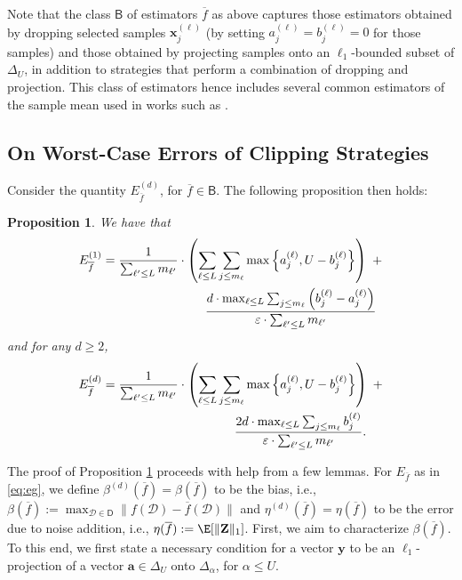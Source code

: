 \documentclass[conference,letterpaper]{IEEEtran}
\newtheorem{proposition}{Proposition}[section]
\theoremstyle{remark}
\theoremstyle{definition}
\begin{document}
Note that the class $\mathsf{B}$ of estimators $\overline{f}$ as above  captures those estimators obtained by dropping selected samples $\mathbf{x}_j^{(\ell)}$ (by setting $a_j^{(\ell)}= b_j^{(\ell)} = 0$ for those samples) and those obtained by projecting samples onto an $\ell_1$-bounded subset of $\Delta_U$, in addition to strategies that perform a combination of dropping and projection. This class of estimators hence includes several common estimators of the sample mean used in works such as \cite{userlevel,dp_preprint,tit-preprint}.


\subsection{On Worst-Case Errors of Clipping Strategies}
\label{sec:worst-case}
Consider the quantity $E_{\overline{f}}^{(d)}$, for $\overline{f}\in \mathsf{B}$. The following proposition then holds:
\begin{proposition}
	\label{lem:worst-case}
	We have that
	\begin{align*}
		E_{\overline{f}}^{(1)} \notag&= \frac{1}{\sum_{\ell'\leq L} m_{\ell'}}\cdot \left(\sum_{\ell\leq L}\sum_{j\leq m_\ell} \max\left\{a_j^{(\ell)},U-b_j^{(\ell)}\right\}\right)\ + \notag\\
		&\ \ \  \ \ \ \ \ \ \  \ \ \ \ \ \ \ \  \ \ \ \  \ \ \ \frac{d\cdot\max_{\ell\leq L} \sum_{j\leq m_\ell} \left(b_j^{(\ell)}-a_j^{(\ell)}\right)}{\varepsilon\cdot \sum_{\ell'\leq L} m_{\ell'}}
	\end{align*}
	and for any $d\geq 2$,
	\begin{align*}
		E_{\overline{f}}^{(d)} \notag&= \frac{1}{\sum_{\ell'\leq L} m_{\ell'}}\cdot \left(\sum_{\ell\leq L}\sum_{j\leq m_\ell} \max\left\{a_j^{(\ell)},U-b_j^{(\ell)}\right\}\right)\ + \notag\\
		&\ \ \  \ \ \ \ \ \ \  \ \ \ \ \ \ \ \  \ \ \ \  \ \ \ \ \ \ \ \ \ \ \frac{2d\cdot\max_{\ell\leq L} \sum_{j\leq m_\ell} b_j^{(\ell)}}{\varepsilon\cdot \sum_{\ell'\leq L} m_{\ell'}}.
	\end{align*}
\end{proposition}
The proof of Proposition \ref{lem:worst-case} proceeds with help from a few lemmas. For $E_{\overline{f}}$ as in \eqref{eq:eg}, we define $\beta^{(d)}(\overline{f}) = \beta(\overline{f})$ to be the bias, i.e., $\beta(\overline{f}):= \max_{\mathcal{D}\in \mathsf{D}} \big \lVert f(\mathcal{D}) - \overline{f}(\mathcal{D}) \big\rVert$ and $\eta^{(d)}(\overline{f})=\eta(\overline{f})$ to be the error due to noise addition, i.e., $\eta(\overline{f}):= \E[\lVert\mathbf{\mathbf{Z}}\rVert_1]$. First, we aim to characterize $\beta(\overline{f})$. To this end, we first state a necessary condition for a vector $\mathbf{y}$ to be an $\ell_1$-projection of a vector $\mathbf{a}\in \Delta_U$ onto $\Delta_\alpha$, for $ \alpha\leq U$. 
\end{document}
